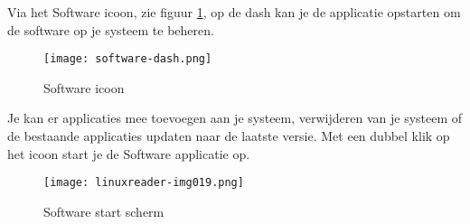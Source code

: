 Via het Software icoon, zie figuur \ref{fig:de_software_icon}, op de dash kan je de applicatie opstarten om de software op je systeem te beheren.

\begin{figure}[H]
\texttt{[image: software-dash.png]}
	\caption{Software icoon}
	\label{fig:de_software_icon}
\end{figure}

Je kan er applicaties mee toevoegen aan je systeem, verwijderen van je systeem of de bestaande applicaties updaten naar de laatste versie. Met een dubbel klik op het icoon start je de Software applicatie op.

\begin{figure}[H]
\texttt{[image: linuxreader-img019.png]}
	\caption{Software start scherm}
	\label{fig:de_software_start}
\end{figure}


